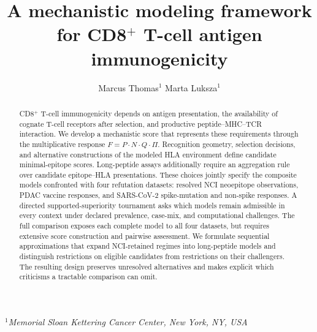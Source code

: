 \documentclass[11pt]{article}
\title{\textbf{A mechanistic modeling framework for CD8$^{+}$ T-cell antigen immunogenicity}}
\author{Marcus Thomas$^{1}$ \quad Marta Luksza$^{1}$}
\date{}
\begin{document}
\maketitle

\begin{flushleft}
\small
$^{1}$\textit{Memorial Sloan Kettering Cancer Center, New York, NY, USA}\\
\end{flushleft}

\begin{abstract}
CD8$^{+}$ T-cell immunogenicity depends on antigen presentation, the
availability of cognate T-cell receptors after selection, and productive
peptide--MHC--TCR interaction. We develop a mechanistic score that represents
these requirements through the multiplicative response
$F=P\cdot N\cdot Q\cdot\Pi$. Recognition geometry, selection decisions, and
alternative constructions of the modeled HLA environment define candidate
minimal-epitope scores. Long-peptide assays additionally require an aggregation
rule over candidate epitope--HLA presentations. These choices jointly specify
the composite models confronted with four refutation datasets: resolved NCI
neoepitope observations, PDAC vaccine responses, and SARS-CoV-2 spike-mutation
and non-spike responses. A directed supported-superiority tournament asks
which models remain admissible in every context under declared prevalence,
case-mix, and computational challenges. The full comparison exposes each
complete model to all four datasets, but requires extensive score construction
and pairwise assessment. We formulate sequential approximations that expand
NCI-retained regimes into long-peptide models and distinguish restrictions on
eligible candidates from restrictions on their challengers. The resulting
design preserves unresolved alternatives and makes explicit which criticisms
a tractable comparison can omit.
\end{abstract}
\end{document}
